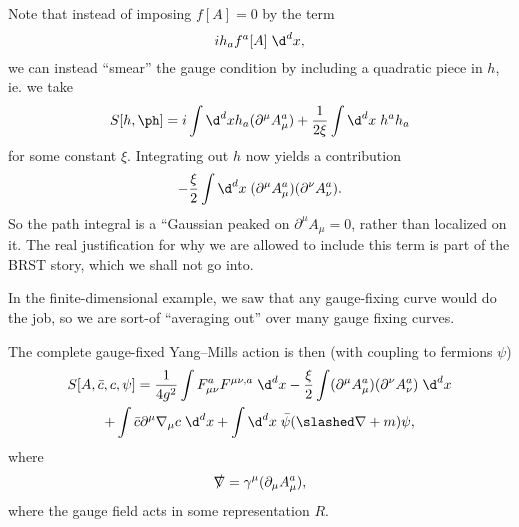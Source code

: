 \documentclass[a4paper]{article}
\begin{document}
Note that instead of imposing $f[A] = 0$ by the %
term
\[
  i h_a f^a[A]\;\d^d x,
\]
we can instead ``smear'' the gauge condition by including a quadratic piece in $h$, ie. we take
\[
  S[h, \ph] = i \int \d^d x h_a (\partial^\mu A_\mu^a) + \frac{1}{2 \xi} \int \d^d x\; h^a h_a
\]
for some constant $\xi$. Integrating out $h$ now yields a contribution
\[
  - \frac{\xi}{2} \int\d^d x\; (\partial^\mu A_\mu^a) (\partial^\nu A_\nu^a).
\]
So the path integral is a ``Gaussian peaked on $\partial^\mu A_\mu = 0$, rather than localized on it. The real justification for why we are allowed to include this term is part of the BRST story, which we shall not go into.

In the finite-dimensional example, we saw that any gauge-fixing curve would do the job, so we are sort-of ``averaging out'' over many gauge fixing curves.

The complete gauge-fixed Yang--Mills action is then (with coupling to fermions $\psi$)
\begin{multline*}
  S[A, \bar{c}, c, \psi] = \frac{1}{4g^2} \int F_{\mu\nu}^a F^{\mu\nu,a}\;\d^d x - \frac{\xi}{2} \int (\partial^\mu A_\mu^a) (\partial^\nu A_\nu^a)\;\d^d x \\
  + \int \bar{c} \partial^\mu \nabla_\mu c \;\d^d x + \int \d^d x\; \bar\psi (\slashed\nabla + m)\psi,
\end{multline*}
where
\[
  \slashed{\nabla} = \gamma^\mu (\partial_\mu A_\mu^a),
\]
where the gauge field acts in some representation $R$.
\end{document}
